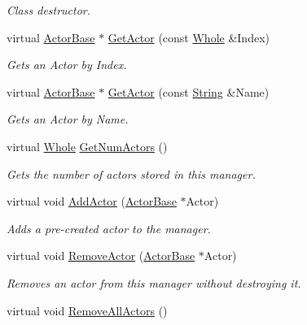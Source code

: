 \begin{DoxyCompactItemize}
\begin{DoxyCompactList}\small\item\em Class destructor. \item\end{DoxyCompactList}\item 
virtual \hyperlink{classphys_1_1ActorBase}{ActorBase} $\ast$ \hyperlink{classphys_1_1ActorManager_ac2700addfdd0d4fc97dc9afe30b3923d}{GetActor} (const \hyperlink{namespacephys_a460f6bc24c8dd347b05e0366ae34f34a}{Whole} \&Index)
\begin{DoxyCompactList}\small\item\em Gets an Actor by Index. \item\end{DoxyCompactList}\item 
virtual \hyperlink{classphys_1_1ActorBase}{ActorBase} $\ast$ \hyperlink{classphys_1_1ActorManager_a42dc22df8b201f25f41676b303e5bf95}{GetActor} (const \hyperlink{namespacephys_aa03900411993de7fbfec4789bc1d392e}{String} \&Name)
\begin{DoxyCompactList}\small\item\em Gets an Actor by Name. \item\end{DoxyCompactList}\item 
virtual \hyperlink{namespacephys_a460f6bc24c8dd347b05e0366ae34f34a}{Whole} \hyperlink{classphys_1_1ActorManager_a9ff2ecc8c6b483729ad59a731a737775}{GetNumActors} ()
\begin{DoxyCompactList}\small\item\em Gets the number of actors stored in this manager. \item\end{DoxyCompactList}\item 
virtual void \hyperlink{classphys_1_1ActorManager_abde76a5c732b77d7bab431d0ef0220ae}{AddActor} (\hyperlink{classphys_1_1ActorBase}{ActorBase} $\ast$Actor)
\begin{DoxyCompactList}\small\item\em Adds a pre-\/created actor to the manager. \item\end{DoxyCompactList}\item 
virtual void \hyperlink{classphys_1_1ActorManager_ac5d3eaf8733a53f433293b0341db55f2}{RemoveActor} (\hyperlink{classphys_1_1ActorBase}{ActorBase} $\ast$Actor)
\begin{DoxyCompactList}\small\item\em Removes an actor from this manager without destroying it. \item\end{DoxyCompactList}\item 
\hypertarget{classphys_1_1ActorManager_aab80825c7dfbbcf33712d94e925faae8}{
virtual void \hyperlink{classphys_1_1ActorManager_aab80825c7dfbbcf33712d94e925faae8}{RemoveAllActors} ()}
\label{classphys_1_1ActorManager_aab80825c7dfbbcf33712d94e925faae8}


\end{DoxyCompactItemize}
